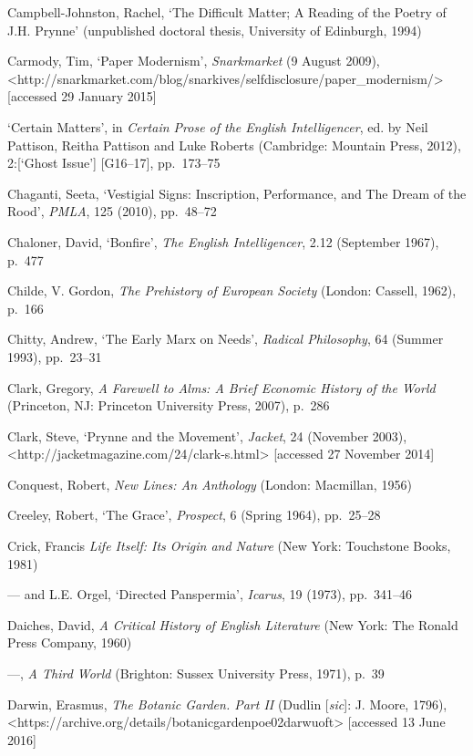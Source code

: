 \documentclass[]{article}
\begin{document}
Campbell-Johnston, Rachel, ‘The Difficult Matter; A Reading of the
Poetry of J.H. Prynne’ (unpublished doctoral thesis, University of
Edinburgh, 1994)

Carmody, Tim, ‘Paper Modernism’, \emph{Snarkmarket} (9 August 2009),\\
\textless{}http://snarkmarket.com/blog/snarkives/selfdisclosure/paper\_modernism/\textgreater{}
{[}accessed 29 January 2015{]}

‘Certain Matters’, in \emph{Certain Prose of the English Intelligencer},
ed. by Neil Pattison, Reitha Pattison and Luke Roberts (Cambridge:
Mountain Press, 2012), 2:{[}‘Ghost Issue’{]} {[}G16–17{]}, pp.~173–75

Chaganti, Seeta, ‘Vestigial Signs: Inscription, Performance, and The
Dream of the Rood’, \emph{PMLA}, 125 (2010), pp.~48–72

Chaloner, David, ‘Bonfire’, \emph{The English Intelligencer}, 2.12
(September 1967), p.~477

Childe, V. Gordon, \emph{The Prehistory of European Society} (London:
Cassell, 1962), p.~166

Chitty, Andrew, ‘The Early Marx on Needs’, \emph{Radical Philosophy}, 64
(Summer 1993), pp.~23–31

Clark, Gregory, \emph{A Farewell to Alms: A Brief Economic History of
the World} (Princeton, NJ: Princeton University Press, 2007), p.~286

Clark, Steve, ‘Prynne and the Movement’, \emph{Jacket}, 24 (November
2003),\\
\textless{}http://jacketmagazine.com/24/clark-s.html\textgreater{}
{[}accessed 27 November 2014{]}

Conquest, Robert, \emph{New Lines: An Anthology} (London: Macmillan,
1956)

Creeley, Robert, ‘The Grace’, \emph{Prospect}, 6 (Spring 1964),
pp.~25–28

Crick, Francis \emph{Life Itself: Its Origin and Nature} (New York:
Touchstone Books, 1981)

— and L.E. Orgel, ‘Directed Panspermia’, \emph{Icarus}, 19 (1973),
pp.~341–46

Daiches, David, \emph{A Critical History of English Literature} (New
York: The Ronald Press Company, 1960)

—, \emph{A Third World} (Brighton: Sussex University Press, 1971), p.~39

Darwin, Erasmus, \emph{The Botanic Garden. Part II} (Dudlin
{[}\emph{sic}{]}: J. Moore, 1796),\\
\textless{}https://archive.org/details/botanicgardenpoe02darwuoft\textgreater{}
{[}accessed 13 June 2016{]}
\end{document}
